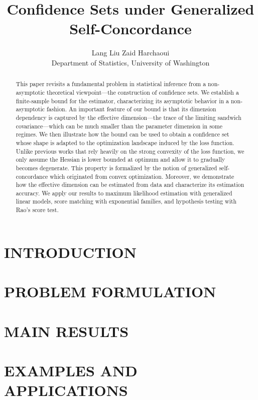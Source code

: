 \documentclass{article}
\title{Confidence Sets under Generalized Self-Concordance}
\author{Lang Liu \qquad Zaid Harchaoui \\
Department of Statistics, University of Washington}
\date{}
\begin{document}
\maketitle
\doparttoc %
\faketableofcontents %

\begin{abstract}
    This paper revisits a fundamental problem in statistical inference from a non-asymptotic theoretical viewpoint---the construction of confidence sets. We establish a finite-sample bound for the estimator, characterizing its asymptotic behavior in a non-asymptotic fashion. An important feature of our bound is that its dimension dependency is captured by the effective dimension---the trace of the limiting sandwich covariance---which can be much smaller than the parameter dimension in some regimes. We then illustrate how the bound can be used to obtain a confidence set whose shape is adapted to the optimization landscape induced by the loss function. Unlike previous works that rely heavily on the strong convexity of the loss function, we only assume the Hessian is lower bounded at optimum and allow it to gradually becomes degenerate. This property is formalized by the notion of generalized self-concordance which originated from convex optimization. Moreover, we demonstrate how the effective dimension can be estimated from data and characterize its estimation accuracy. We apply our results to maximum likelihood estimation with generalized linear models, score matching with exponential families, and hypothesis testing with Rao's score test.
\end{abstract}

\section{INTRODUCTION}
\label{sec:intro}



\section{PROBLEM FORMULATION}
\label{sec:problem}



\section{MAIN RESULTS}
\label{sec:main_results}



\section{EXAMPLES AND APPLICATIONS}
\label{sec:application}

\end{document}
